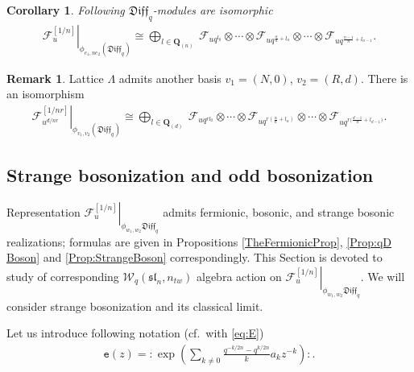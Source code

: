 \documentclass[pdftex]{sigma}
\numberwithin{equation}{section}
\newtheorem{Corollary}[Theorem]{Corollary}
\theoremstyle{definition}
\newtheorem{Remark}[Theorem]{Remark}
\newcommand{\qD}{\mathfrak{Diff}_q}
\newcommand{ \twW }{ \mathcal{W}_{q} ( \mathfrak{sl}_n, n_{tw} ) }
\newcommand{\se}{\mathtt{e}}
\begin{document}
\begin{Corollary}Following $\qD$-modules are isomorphic
\begin{gather}
\left. \mathcal{F}^{[1/n]}_{u} \right|_{\phi_{e_1,ne_2}(\qD)} \cong \bigoplus_{ l \in \mathbf{Q}_{(n)}} \ \mathcal{F}_{u q^{ l_0}} \otimes \cdots \otimes \mathcal{F}_{u q^{\frac{\alpha}{n}+ l_{\alpha}
}} \otimes \cdots \otimes \mathcal{F}_{u q^{\frac{n-1}{n}+ l_{n-1}}}. \label{eq:th:decomposition}
\end{gather}
\end{Corollary}

\begin{Remark}
Lattice $\Lambda$ admits another basis $v_1=(N,0)$, $v_2 = (R,d)$. There is an isomorphism
\begin{gather*}
\left. \mathcal{F}^{[1/nr]}_{u^{d/nr}} \right|_{\phi_{v_1,v_2}(\qD)} \cong \bigoplus_{ l \in \mathbf{Q}_{(d)}} \ \mathcal{F}_{u q^{ rl_0}} \otimes \cdots \otimes \mathcal{F}_{u q^{r\left(\frac{\alpha}{n}+ l_{\alpha} \right)
}} \otimes \cdots \otimes \mathcal{F}_{u q^{r \big(\frac{d-1}{d}+ l_{d-1} \big)}}.
\end{gather*}
\end{Remark}

\subsection{Strange bosonization and odd bosonization}
Representation $\left. \mathcal{F}_u^{[1/n]} \right|_{\phi_{w_1, w_2} \qD}$ admits fermionic, bosonic, and strange bosonic realizations; formulas are given in Propositions \ref{TheFermionicProp}, \ref{Prop:qD Boson} and \ref{Prop:StrangeBoson} correspondingly. This Section is devoted to study of corresponding $\twW$ algebra action on $\left. \mathcal{F}_u^{[1/n]} \right|_{\phi_{w_1, w_2} \qD}$. We will consider strange bosonization and its classical limit.


Let us introduce following notation (cf.\ with \eqref{eq:E})
\begin{gather*}
\se(z) = {: \! \exp \left( \sum_{k \ne 0} \frac{q^{-k/2n}-q^{k/2n}}{k} a_{k} z^{-k} \right) \! :}.
\end{gather*}
\end{document}
